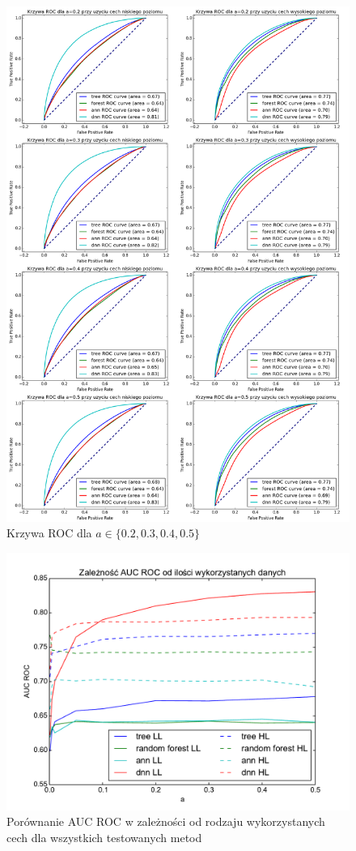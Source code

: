 \begin{figure}[ht!]
\centering
\includegraphics[scale=0.3]{res/all2.png}
\caption[Caption for LOF]{Krzywa ROC dla $a\in\{0.2, 0.3, 0.4, 0.5\}$\label{higgsall2}}
\end{figure} 

\begin{figure}[ht!]
\centering
\includegraphics[scale=0.8]{res/higgssummary.pdf}
\caption[Caption for LOF]{Porównanie AUC ROC w zależności od rodzaju wykorzystanych cech dla wszystkich testowanych metod\label{higgssummary}}
\end{figure} 

